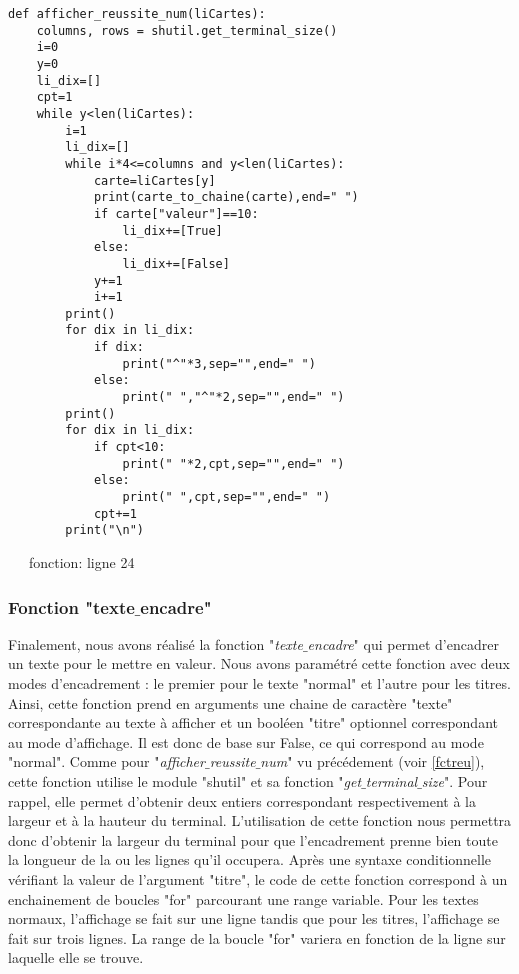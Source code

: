 \documentclass[10pt,a4paper,french,titlepage]{article}
\theoremstyle{definition}
\begin{document}
\begin{lstlisting}
def afficher_reussite_num(liCartes):
    columns, rows = shutil.get_terminal_size()
    i=0
    y=0
    li_dix=[]
    cpt=1
    while y<len(liCartes):
        i=1
        li_dix=[]
        while i*4<=columns and y<len(liCartes): 
            carte=liCartes[y]
            print(carte_to_chaine(carte),end=" ")
            if carte["valeur"]==10:
                li_dix+=[True]
            else:
                li_dix+=[False]
            y+=1
            i+=1
        print()
        for dix in li_dix:
            if dix:
                print("^"*3,sep="",end=" ")
            else:
                print(" ","^"*2,sep="",end=" ")
        print()
        for dix in li_dix:
            if cpt<10:
                print(" "*2,cpt,sep="",end=" ")
            else:
                print(" ",cpt,sep="",end=" ")
            cpt+=1
        print("\n")
\end{lstlisting}
~~~fonction: ligne 24

\subsubsection{Fonction "texte$\_$encadre"}
Finalement, nous avons réalisé la fonction "\textit{texte$\_$encadre}" qui permet d'encadrer un texte pour le mettre en valeur. Nous avons paramétré cette fonction avec deux modes d’encadrement : le premier pour le texte "normal" et l'autre pour les titres. Ainsi, cette fonction prend en arguments une chaine de caractère "texte" correspondante au texte à afficher et un booléen "titre" optionnel correspondant au mode d'affichage. Il est donc de base sur False, ce qui correspond au mode "normal". Comme pour "\textit{afficher$\_$reussite$\_$num}" vu précédement  (voir \ref{fctreu}), cette fonction utilise le module "shutil" et sa fonction "\textit{get$\_$terminal$\_$size}". Pour rappel, elle permet d'obtenir deux entiers correspondant respectivement à la largeur et à la hauteur du terminal. L'utilisation de cette fonction nous permettra donc d'obtenir la largeur du terminal pour que l'encadrement prenne bien toute la longueur de la ou les lignes qu'il occupera. Après une syntaxe conditionnelle vérifiant la valeur de l'argument "titre", le code de cette fonction correspond à un enchainement de boucles "for" parcourant une range variable. Pour les textes normaux, l'affichage se fait sur une ligne tandis que pour les titres, l'affichage se fait sur trois lignes. La range de la boucle "for" variera en fonction de la ligne sur laquelle elle se trouve.
\end{document}
